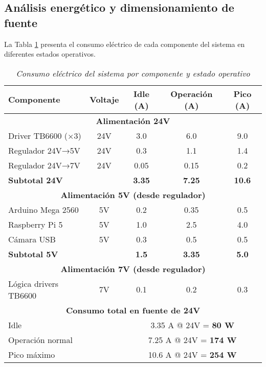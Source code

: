 \subsection{Análisis energético y dimensionamiento de fuente}

La Tabla \ref{tab:consumo_energetico} presenta el consumo eléctrico de cada componente del sistema en diferentes estados operativos.

\begin{table}[H]
\centering
\small
\begin{tabular}{|l|c|c|c|c|}
\hline
\textbf{Componente} & \textbf{Voltaje} & \textbf{Idle (A)} & \textbf{Operación (A)} & \textbf{Pico (A)} \\
\hline
\multicolumn{5}{|c|}{\textbf{Alimentación 24V}} \\
\hline
Driver TB6600 (×3) & 24V & 3.0 & 6.0 & 9.0 \\
\hline
Regulador 24V→5V & 24V & 0.3 & 1.1 & 1.4 \\
\hline
Regulador 24V→7V & 24V & 0.05 & 0.15 & 0.2 \\
\hline
\multicolumn{2}{|l|}{\textbf{Subtotal 24V}} & \textbf{3.35} & \textbf{7.25} & \textbf{10.6} \\
\hline
\hline
\multicolumn{5}{|c|}{\textbf{Alimentación 5V (desde regulador)}} \\
\hline
Arduino Mega 2560 & 5V & 0.2 & 0.35 & 0.5 \\
\hline
Raspberry Pi 5 & 5V & 1.0 & 2.5 & 4.0 \\
\hline
Cámara USB & 5V & 0.3 & 0.5 & 0.5 \\
\hline
\multicolumn{2}{|l|}{\textbf{Subtotal 5V}} & \textbf{1.5} & \textbf{3.35} & \textbf{5.0} \\
\hline
\hline
\multicolumn{5}{|c|}{\textbf{Alimentación 7V (desde regulador)}} \\
\hline
Lógica drivers TB6600 & 7V & 0.1 & 0.2 & 0.3 \\
\hline
\hline
\multicolumn{5}{|c|}{\textbf{Consumo total en fuente de 24V}} \\
\hline
\multicolumn{2}{|l|}{Idle} & \multicolumn{3}{c|}{3.35 A @ 24V = \textbf{80 W}} \\
\hline
\multicolumn{2}{|l|}{Operación normal} & \multicolumn{3}{c|}{7.25 A @ 24V = \textbf{174 W}} \\
\hline
\multicolumn{2}{|l|}{Pico máximo} & \multicolumn{3}{c|}{10.6 A @ 24V = \textbf{254 W}} \\
\hline
\end{tabular}
\caption{\textit{Consumo eléctrico del sistema por componente y estado operativo}}
\label{tab:consumo_energetico}
\end{table}

